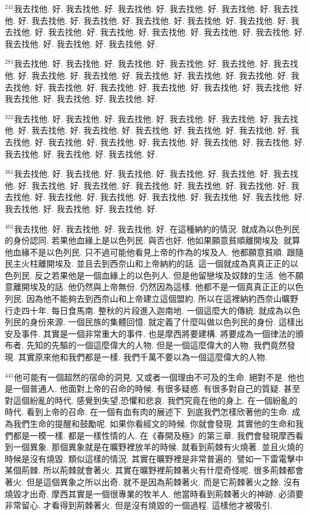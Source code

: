 \documentclass{book}
\begin{document}
$^{241}$我去找他.
好.
我去找他.
好.
我去找他.
好.
我去找他.
好.
我去找他.
好.
我去找他.
好.
我去找他.
好.
我去找他.
好.
我去找他.
好.
我去找他.
好.
我去找他.
好.
我去找他.
好.
我去找他.
好.
我去找他.
好.
我去找他.
好.
我去找他.
好.
我去找他.
好.
我去找他.
好.
我去找他.
好.
我去找他.
好.

$^{281}$我去找他.
好.
我去找他.
好.
我去找他.
好.
我去找他.
好.
我去找他.
好.
我去找他.
好.
我去找他.
好.
我去找他.
好.
我去找他.
好.
我去找他.
好.
我去找他.
好.
我去找他.
好.
我去找他.
好.
我去找他.
好.
我去找他.
好.
我去找他.
好.
我去找他.
好.
我去找他.
好.
我去找他.
好.
我去找他.
好.

$^{321}$我去找他.
好.
我去找他.
好.
我去找他.
好.
我去找他.
好.
我去找他.
好.
我去找他.
好.
我去找他.
好.
我去找他.
好.
我去找他.
好.
我去找他.
好.
我去找他.
好.
我去找他.
好.
我去找他.
好.
我去找他.
好.
我去找他.
好.
我去找他.
好.
我去找他.
好.
我去找他.
好.
我去找他.
好.
我去找他.
好.

$^{361}$我去找他.
好.
我去找他.
好.
我去找他.
好.
我去找他.
好.
我去找他.
好.
我去找他.
好.
我去找他.
好.
我去找他.
好.
我去找他.
好.
我去找他.
好.
我去找他.
好.
我去找他.
好.
我去找他.
好.
我去找他.
好.
我去找他.
好.
我去找他.
好.
我去找他.
好.
我去找他.
好.
我去找他.
好.
我去找他.
好.

$^{401}$我去找他.
好.
我去找他.
好.
我去找他.
好.
在這種納約的情況.
就成為以色列民的身份認同.
若果他血緣上是以色列民.
與否也好.
他如果願意貧順離開埃及.
就算他血緣不是以色列民.
只不過可能他看見上帝的作為的埃及人.
他都願意貧順.
跟隨民主火柱離開埃及.
並且去到西奈山和上帝納約的話.
這一個就成為真真正正的以色列民.
反之若果他是一個血緣上的以色列人.
但是他留戀埃及奴隸的生活.
他不願意離開埃及的話.
他仍然與上帝無份.
仍然因為這樣.
他都不是一個真真正正的以色列民.
因為他不能夠去到西奈山和上帝建立這個盟約.
所以在這裡納約西奈山曠野行走四十年.
每日食馬南.
整秋的片段進入迦南地.
一個這麼大的傳統.
就成為以色列民的身份來源.
一個民族的集體回憶.
就定義了什麼叫做以色列民的身份.
這樣出安及事件.
其實是一個非常重大的事件.
也是摩西將要建構.
將要成為一個律法的頒布者.
先知的先驅的一個這麼偉大的人物.
但是一個這麼偉大的人物.
我們竟然發現.
其實原來他和我們都是一樣.
我們千萬不要以為一個這麼偉大的人物.

$^{441}$他可能有一個超然的宿命的洞見.
又或者一個理由不可及的生命.
絕對不是.
他也是一個普通人.
他面對上帝的召命的時候.
有很多疑惑.
有很多對自己的質疑.
甚至對這個紛亂的時代.
感覺到失望,恐懼和悲哀.
我們究竟在他的身上.
在一個紛亂的時代.
看到上帝的召命.
在一個有血有肉的展述下.
到底我們怎樣欣著他的生命.
成為我們生命的提醒和鼓勵呢.
如果你看經文的時候.
你就會發現.
其實他的生命和我們都是一模一樣.
都是一樣性情的人.
在《春開及極》的第三章.
我們會發現摩西看到一個異象.
那個異象就是在曠野裡放羊的時候.
就看到荊棘有火燒著.
並且火燒的時候是沒有燒毀.
類似這樣的情況.
其實在曠野裡是非常普遍的.
譬如一下雷電擊中某個荊棘.
所以荊棘就會著火.
其實在曠野裡荊棘著火有什麼奇怪呢.
很多荊棘都會著火.
但是這個異象之所以出奇.
就不是因為荊棘著火.
而是它荊棘著火之餘.
沒有燒毀才出奇.
摩西其實是一個很專業的牧羊人.
他當時看到荊棘著火的神跡.
必須要非常留心.
才看得到荊棘著火.
但是沒有燒毀的一個過程.
這樣他才被吸引.
\end{document}
